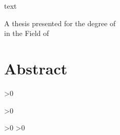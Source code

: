 \documentclass[
    paper=a4,
    fontsize=11pt,
    twoside=false,
    parskip=half,
    listof=totoc
]{scrbook}
\begin{document}
\begin{titlepage}
    \begin{center}
        \vspace*{1cm}

        \Huge
        \textbf{\thetitle}

        \vspace{0.5cm}
        \LARGE
        text

        \vspace{1.5cm}

        \textbf{\theauthor}

        \vfill

        \large
        A thesis presented for the degree of\\
        \textit{\thesisdegree}
        in the Field of \thesisfield

        \vspace{0.8cm}


        \vspace{0.8cm}

        \textbf{\thedate}

    \end{center}
\end{titlepage}
\frontmatter
\chapter*{Abstract}








%


\tableofcontents
\ifnum{}>0
  \listoffigures
\fi
\ifnum{}>0
  \listoftables
\fi
\ifnum{}>0
  \lstlistoflistings
\fi
\ifnum{}>0
  \listofalgorithms
\fi



\mainmatter








\end{document}
